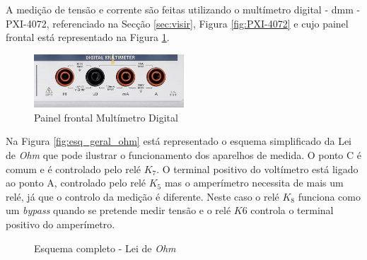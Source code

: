 A medição de tensão e corrente são feitas utilizando o multímetro digital - \Acrfull{dmm} - PXI-4072, referenciado na Secção \ref{sec:visir}, Figura \ref{fig:PXI-4072} e cujo painel frontal está representado na Figura \ref{fig:frontDMM}.

\begin{figure}[hbtp]
	\centering
	\includegraphics[width=0.5\textwidth]{figures/promenorDMM.png}
	\caption{Painel frontal Multímetro Digital}
	\label{fig:frontDMM}
\end{figure}

Na Figura \ref{fig:esq_geral_ohm} está representado o esquema simplificado da Lei de \textit{Ohm} que pode ilustrar o funcionamento dos aparelhos de medida. O ponto C é comum e é controlado pelo relé $K_{7}$. O terminal positivo do voltímetro está ligado ao ponto A, controlado pelo relé $K_{5}$ mas o amperímetro necessita de mais um relé, já que o controlo da medição é diferente. Neste caso o relé $K_{8}$ funciona como um \textit{bypass} quando se pretende medir tensão e o relé $K{6}$ controla o terminal positivo do amperímetro. 

\begin{figure}[hbtp]
	\centering%
		\centering
		\qquad
		\caption{Esquema completo - Lei de \textit{Ohm}}%
		\label{fig:}%
	\end{figure}

